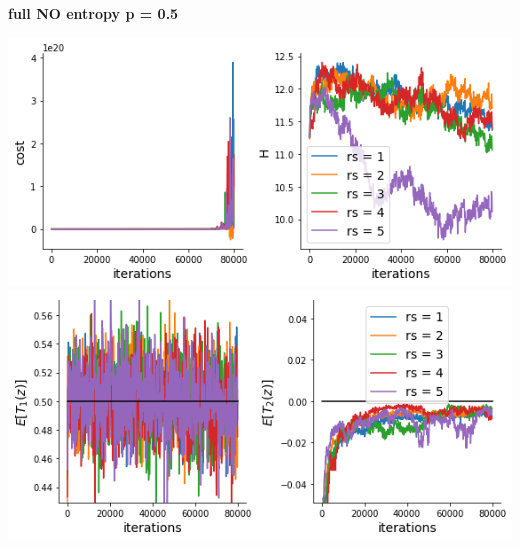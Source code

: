\documentclass[11pt]{article}
\begin{document}
\textbf{full NO entropy p = 0.5}
\begin{center}
\includegraphics[scale=0.6]{figs/cost_H_SC_full_c=0_p=50.png} \\
\includegraphics[scale=0.6]{figs/constraints_SC_full_c=0_p=50.png}
\end{center}
\end{document}
